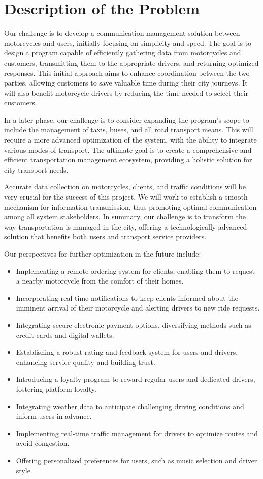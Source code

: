 
\section{Description of the Problem}

Our challenge is to develop a communication management solution between motorcycles and users, initially focusing on simplicity and speed. The goal is to design a program capable of efficiently gathering data from motorcycles and customers, transmitting them to the appropriate drivers, and returning optimized responses. This initial approach aims to enhance coordination between the two parties, allowing customers to save valuable time during their city journeys. It will also benefit motorcycle drivers by reducing the time needed to select their customers.

In a later phase, our challenge is to consider expanding the program's scope to include the management of taxis, buses, and all road transport means. This will require a more advanced optimization of the system, with the ability to integrate various modes of transport. The ultimate goal is to create a comprehensive and efficient transportation management ecosystem, providing a holistic solution for city transport needs.

Accurate data collection on motorcycles, clients, and traffic conditions will be very crucial for the success of this project. We will work to establish a smooth mechanism for information transmission, thus promoting optimal communication among all system stakeholders. In summary, our challenge is to transform the way transportation is managed in the city, offering a technologically advanced solution that benefits both users and transport service providers.

Our perspectives for further optimization in the future include:
\begin{itemize}
  \item Implementing a remote ordering system for clients, enabling them to request a nearby motorcycle from the comfort of their homes.
  \item Incorporating real-time notifications to keep clients informed about the imminent arrival of their motorcycle and alerting drivers to new ride requests.
  \item Integrating secure electronic payment options, diversifying methods such as credit cards and digital wallets.
  \item Establishing a robust rating and feedback system for users and drivers, enhancing service quality and building trust.
  \item Introducing a loyalty program to reward regular users and dedicated drivers, fostering platform loyalty.
  \item Integrating weather data to anticipate challenging driving conditions and inform users in advance.
  \item Implementing real-time traffic management for drivers to optimize routes and avoid congestion.
  \item Offering personalized preferences for users, such as music selection and driver style.
\end{itemize}
